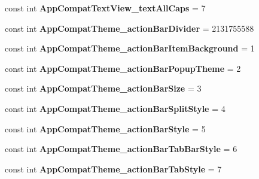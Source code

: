 \begin{DoxyCompactItemize}
const int {\bfseries App\+Compat\+Text\+View\+\_\+text\+All\+Caps} = 7
\item 
\mbox{\label{classst_delivery_1_1_resource_1_1_styleable_a16d01e7921d525b200e5a4511a4e8160}} 
const int {\bfseries App\+Compat\+Theme\+\_\+action\+Bar\+Divider} = 2131755588
\item 
\mbox{\label{classst_delivery_1_1_resource_1_1_styleable_ad3bc284cedfad66bec3cec40891a6f20}} 
const int {\bfseries App\+Compat\+Theme\+\_\+action\+Bar\+Item\+Background} = 1
\item 
\mbox{\label{classst_delivery_1_1_resource_1_1_styleable_a5bbcdf8c7d37801b527cf3fe48d27a37}} 
const int {\bfseries App\+Compat\+Theme\+\_\+action\+Bar\+Popup\+Theme} = 2
\item 
\mbox{\label{classst_delivery_1_1_resource_1_1_styleable_acc4ef28636bb42ab431f4c879051d893}} 
const int {\bfseries App\+Compat\+Theme\+\_\+action\+Bar\+Size} = 3
\item 
\mbox{\label{classst_delivery_1_1_resource_1_1_styleable_a6c5dac93e86cbc3fc7863fc9d44a249b}} 
const int {\bfseries App\+Compat\+Theme\+\_\+action\+Bar\+Split\+Style} = 4
\item 
\mbox{\label{classst_delivery_1_1_resource_1_1_styleable_ab4ac19fc25ca30336e521c5eff0d8ea1}} 
const int {\bfseries App\+Compat\+Theme\+\_\+action\+Bar\+Style} = 5
\item 
\mbox{\label{classst_delivery_1_1_resource_1_1_styleable_a038eba99774fb115040b77184483db98}} 
const int {\bfseries App\+Compat\+Theme\+\_\+action\+Bar\+Tab\+Bar\+Style} = 6
\item 
\mbox{\label{classst_delivery_1_1_resource_1_1_styleable_a701c5044ca7d42470cf1b374682c177b}} 
const int {\bfseries App\+Compat\+Theme\+\_\+action\+Bar\+Tab\+Style} = 7
\item 
\mbox{\label{classst_delivery_1_1_resource_1_1_styleable_aeebdd9cb0a4e67ac05c390a92787279e}} 

\end{DoxyCompactItemize}
